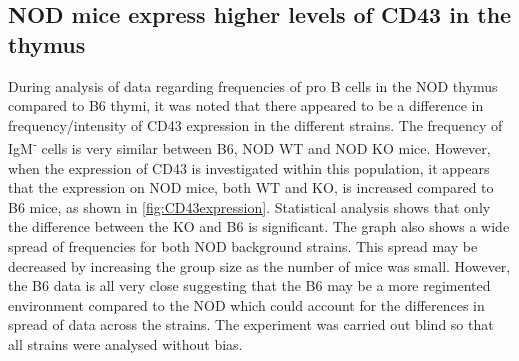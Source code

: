\subsection{NOD mice express higher levels of CD43 in the thymus}
\label{Results:CD43}

During analysis of data regarding frequencies of pro B cells in the NOD thymus compared to B6 thymi, it was noted that there appeared to be a difference in frequency/intensity of CD43 expression in the different strains.
The frequency of IgM\textsuperscript{-} cells is very similar between B6, NOD WT and NOD KO mice.
However, when the expression of CD43 is investigated within this population, it appears that the expression on NOD mice, both WT and KO, is increased compared to B6 mice, as shown in \cref{fig:CD43expression}.
Statistical analysis shows that only the difference between the KO and B6 is significant.
The graph also shows a wide spread of frequencies for both NOD background strains.
This spread may be decreased by increasing the group size as the number of mice was small.
However, the B6 data is all very close suggesting that the B6 may be a more regimented environment compared to the NOD which could account for the differences in spread of data across the strains.
The experiment was carried out blind so that all strains were analysed without bias.


